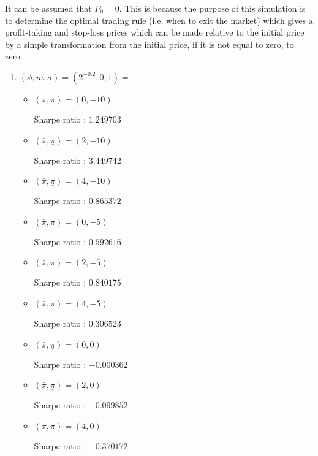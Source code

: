 \documentclass[12pt]{article}
\begin{document}
\begin{enumerate}
It can be assumed that $P_0 = 0$. This is because the purpose of this simulation is to determine the optimal trading rule (i.e. when to exit the market) which gives a profit-taking and stop-loss prices which can be made relative to the initial price by a simple transformation from the initial price, if it is not equal to zero, to zero.



\vskip 10pt


\vskip 30pt

\begin{enumerate}

\item $(\phi, m, \sigma) = (2^{-0.2},0,1) = $

\begin{itemize}

\item $(\bar{\pi}, \underline{\pi}) = (0,-10)$

Sharpe ratio : $1.249703$

\item $(\bar{\pi}, \underline{\pi}) = (2,-10)$

Sharpe ratio : $3.449742$

\item $(\bar{\pi}, \underline{\pi}) = (4,-10)$

Sharpe ratio : $0.865372$

\item $(\bar{\pi}, \underline{\pi}) = (0,-5)$

Sharpe ratio : $0.592616$

\item $(\bar{\pi}, \underline{\pi}) = (2,-5)$

Sharpe ratio : $0.840175$

\item $(\bar{\pi}, \underline{\pi}) = (4,-5)$

Sharpe ratio : $0.306523$

\item $(\bar{\pi}, \underline{\pi}) = (0,0)$

Sharpe ratio : $-0.000362$

\item $(\bar{\pi}, \underline{\pi}) = (2,0)$

Sharpe ratio : $-0.099852$

\item $(\bar{\pi}, \underline{\pi}) = (4,0)$

Sharpe ratio : $-0.370172$


\end{itemize}
\end{enumerate}
\end{enumerate}
\end{document}
